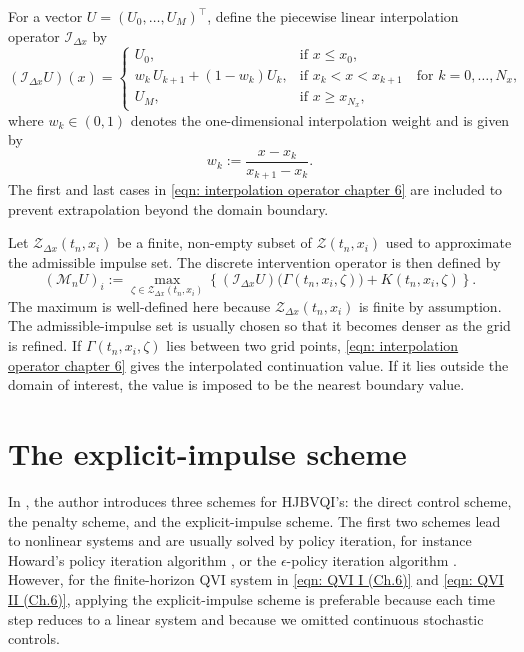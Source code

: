 For a vector $U=(U_0,\ldots,U_M)^\top$, define the piecewise linear interpolation operator $\mathcal{I}_{\Delta x}$ by
\begin{equation}
     (\mathcal{I}_{\Delta x} U)(x)=
     \begin{cases}
        U_0, & \text{if } x \leq x_0, \\[1ex]
        w_k \, U_{k+1} + (1-w_k) U_k, & \text{if } x_k < x < x_{k+1} \quad \text{for } k=0,\ldots,N_x, \\[1ex]
        U_M, & \text{if } x \geq x_{N_x},
    \end{cases}
    \label{eqn: interpolation operator chapter 6}
\end{equation}
where $w_k \in (0,1)$ denotes the one-dimensional interpolation weight and is given by
\begin{equation*}
    w_k := \frac{x-x_k}{x_{k+1}-x_k}.
\end{equation*}
The first and last cases in \eqref{eqn: interpolation operator chapter 6} are included to prevent extrapolation beyond the domain boundary.

Let $\mathcal{Z}_{\Delta x}(t_n,x_i)$ be a finite, non-empty subset of $\mathcal{Z}(t_n,x_i)$ used to approximate the admissible impulse set. The discrete intervention operator is then defined by
\begin{equation}
    (\mathcal{M}_n U)_i := \max_{\zeta \in \mathcal{Z}_{\Delta x}(t_n,x_i)}
    \left\{(\mathcal{I}_{\Delta x}U)\big(\Gamma(t_n,x_i,\zeta)\big) + K(t_n,x_i,\zeta)\right\}.
    \label{eqn: discrete intervention operator chapter 6}
\end{equation}
The maximum is well-defined here because $\mathcal{Z}_{\Delta x}(t_n,x_i)$ is finite by assumption. The admissible-impulse set is usually chosen so that it becomes denser as the grid is refined. If $\Gamma(t_n,x_i,\zeta)$ lies between two grid points, \eqref{eqn: interpolation operator chapter 6} gives the interpolated continuation value. If it lies outside the domain of interest, the value is imposed to be the nearest boundary value.


\section{The explicit-impulse scheme}
\label{section: The explicit-impulse scheme}
In \cite{azimzadeh2018impulsecontrolfinancenumerical}, the author introduces three schemes for HJBVQI's: the direct control scheme, the penalty scheme, and the explicit-impulse scheme. The first two schemes lead to nonlinear systems and are usually solved by policy iteration, for instance Howard's policy iteration algorithm \cite{bokanowski2009some, howard1960dynamic}, or the $\epsilon$-policy iteration algorithm {\cite[Chapter 3]{azimzadeh2018impulsecontrolfinancenumerical}}. However, for the finite-horizon QVI system in \eqref{eqn: QVI I (Ch.6)} and \eqref{eqn: QVI II (Ch.6)}, applying the explicit-impulse scheme is preferable because each time step reduces to a linear system and because we omitted continuous stochastic controls. 

